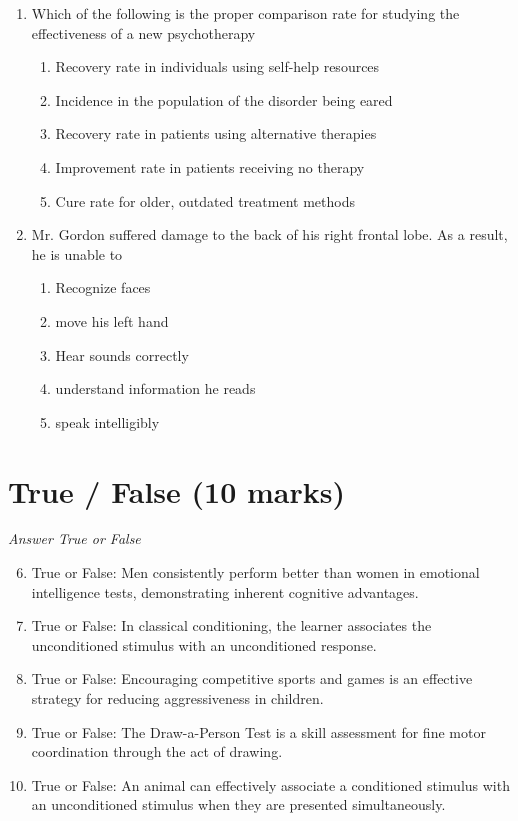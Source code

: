 \documentclass[12pt]{article}
\begin{document}
\begin{enumerate}[label=\arabic*.]
\item Which of the following is the proper comparison rate for studying the effectiveness of a new psychotherapy
\begin{enumerate}[label=(\alph*)]
    \item Recovery rate in individuals using self-help resources
    \item Incidence in the population of the disorder being eared
    \item Recovery rate in patients using alternative therapies
    \item Improvement rate in patients receiving no therapy
    \item Cure rate for older, outdated treatment methods
\end{enumerate}
\item Mr. Gordon suffered damage to the back of his right frontal lobe. As a result, he is unable to
\begin{enumerate}[label=(\alph*)]
    \item Recognize faces
    \item move his left hand
    \item Hear sounds correctly
    \item understand information he reads
    \item speak intelligibly
\end{enumerate}
\end{enumerate}

\section*{True / False (10 marks)}
\textit{Answer True or False}
\begin{enumerate}[label=\arabic*.]
\setcounter{enumi}{5}
\item True or False: Men consistently perform better than women in emotional intelligence tests, demonstrating inherent cognitive advantages.
\item True or False: In classical conditioning, the learner associates the unconditioned stimulus with an unconditioned response.
\item True or False: Encouraging competitive sports and games is an effective strategy for reducing aggressiveness in children.
\item True or False: The Draw-a-Person Test is a skill assessment for fine motor coordination through the act of drawing.
\item True or False: An animal can effectively associate a conditioned stimulus with an unconditioned stimulus when they are presented simultaneously.
\end{enumerate}
\end{document}
